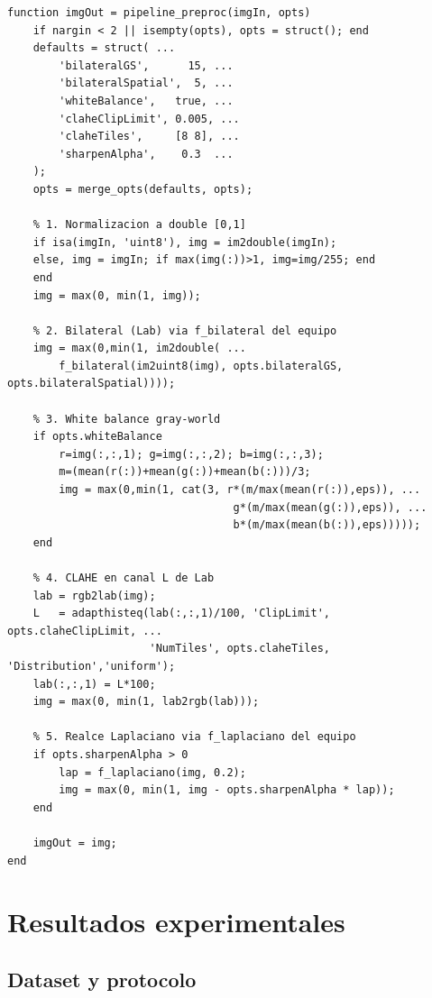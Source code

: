 \documentclass[11pt,a4paper]{article}
\begin{document}
\begin{lstlisting}[caption={\texttt{src/preprocessing/pipeline\_preproc.m} — función principal.}]
function imgOut = pipeline_preproc(imgIn, opts)
    if nargin < 2 || isempty(opts), opts = struct(); end
    defaults = struct( ...
        'bilateralGS',      15, ...
        'bilateralSpatial',  5, ...
        'whiteBalance',   true, ...
        'claheClipLimit', 0.005, ...
        'claheTiles',     [8 8], ...
        'sharpenAlpha',    0.3  ...
    );
    opts = merge_opts(defaults, opts);

    % 1. Normalizacion a double [0,1]
    if isa(imgIn, 'uint8'), img = im2double(imgIn);
    else, img = imgIn; if max(img(:))>1, img=img/255; end
    end
    img = max(0, min(1, img));

    % 2. Bilateral (Lab) via f_bilateral del equipo
    img = max(0,min(1, im2double( ...
        f_bilateral(im2uint8(img), opts.bilateralGS, opts.bilateralSpatial))));

    % 3. White balance gray-world
    if opts.whiteBalance
        r=img(:,:,1); g=img(:,:,2); b=img(:,:,3);
        m=(mean(r(:))+mean(g(:))+mean(b(:)))/3;
        img = max(0,min(1, cat(3, r*(m/max(mean(r(:)),eps)), ...
                                   g*(m/max(mean(g(:)),eps)), ...
                                   b*(m/max(mean(b(:)),eps)))));
    end

    % 4. CLAHE en canal L de Lab
    lab = rgb2lab(img);
    L   = adapthisteq(lab(:,:,1)/100, 'ClipLimit', opts.claheClipLimit, ...
                      'NumTiles', opts.claheTiles, 'Distribution','uniform');
    lab(:,:,1) = L*100;
    img = max(0, min(1, lab2rgb(lab)));

    % 5. Realce Laplaciano via f_laplaciano del equipo
    if opts.sharpenAlpha > 0
        lap = f_laplaciano(img, 0.2);
        img = max(0, min(1, img - opts.sharpenAlpha * lap));
    end

    imgOut = img;
end
\end{lstlisting}

\section{Resultados experimentales}
\label{sec:resultados}

\subsection{Dataset y protocolo}
\end{document}
